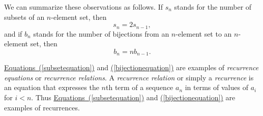 \documentclass[10pt,]{book}
\theoremstyle{plain}
\theoremstyle{definition}
\theoremstyle{definition}
\numberwithin{equation}{chapter}
\newcommand{\lt}{<}
\begin{document}
We can summarize these observations as follows. If \(s_n\) stands for the number of subsets of an \(n\)-element set, then%
\begin{equation}
s_n =2s_{n-1},\label{subsetequation}
\end{equation}
and if \(b_n\) stands for the number of bijections from an \(n\)-element set to an \(n\)-element set, then%
\begin{equation}
b_n =
nb_{n-1}.\label{bijectionequation}
\end{equation}
%
\par
\hyperref[subsetequation]{Equations~(\ref{subsetequation})} and \hyperref[bijectionequation]{(\ref{bijectionequation})} are examples of \emph{recurrence equations} or \emph{recurrence relations}. A \emph{recurrence relation} or simply a \emph{recurrence} is an equation that expresses the \(n\)th term of a sequence \(a_n\) in terms of values of \(a_i\) for \(i\lt n\). Thus \hyperref[subsetequation]{Equations~(\ref{subsetequation})} and \hyperref[bijectionequation]{(\ref{bijectionequation})} are examples of recurrences.%
\typeout{************************************************}
\typeout{************************************************}
\end{document}
